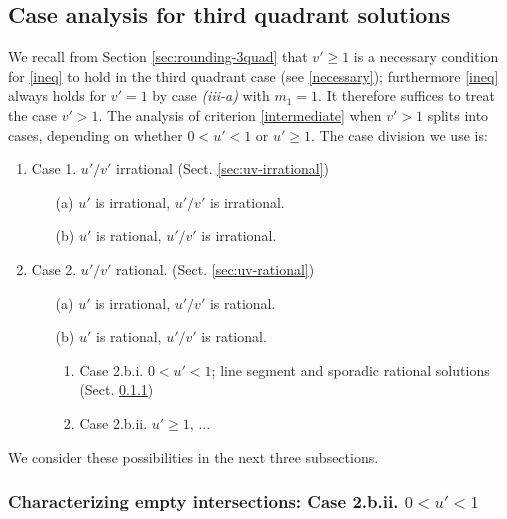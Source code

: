 \documentclass[12pt,letterpaper, reqno]{amsart}
\theoremstyle{definition}
\theoremstyle{remark}
\newcommand{\uu}{{u'}}
\newcommand{\vv}{{v'}}
\begin{document}
\subsection{Case analysis for  third quadrant solutions}\label{sec52a}
We recall from Section \ref{sec:rounding-3quad} that $\vv\geq 1$ 
is a necessary condition for 
\eqref{ineq} to hold 
 in the third quadrant case (see \eqref{necessary});  furthermore  \eqref{ineq} always holds
for $\vv=1$ by case {\it (iii-a)} with $m_1=1$.
It  therefore suffices to treat the case  $\vv>1$. 
The analysis of criterion \eqref{intermediate} when $\vv >1$   splits into cases, 
depending on whether ${0 < \uu <1}$ or $\uu\ge 1$. 
The case division we use is:
\begin{enumerate}
\item
Case 1. $\uu/\vv$ irrational (Sect. \ref{sec:uv-irrational})
\begin{enumerate}
\item[(a)]
$\uu$ is irrational, $\uu/\vv$ is irrational.
\item[(b)]
$\uu$ is rational, $\uu/\vv$ is irrational.
\end{enumerate}
\item Case 2. $\uu/\vv$ rational. (Sect. \ref{sec:uv-rational})
\begin{enumerate}
\item[(a)]
$\uu$ is irrational, $\uu/\vv$ is rational.
\item[(b)]
$\uu$ is rational, $\uu/\vv$ is rational.
\begin{enumerate}
\item 
Case 2.b.i. $0 < \uu <1$; line segment and sporadic rational solutions (Sect. \ref{sec:53})
\item 
Case 2.b.ii. $\uu \geq 1$, ...
\end{enumerate}

\end{enumerate}
\end{enumerate}
We consider these possibilities in the next three subsections.

%
%
\subsubsection{Characterizing empty intersections: Case 2.b.ii. $0 < {\uu} <1$}\label{sec:53}
\end{document}
